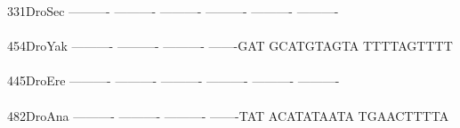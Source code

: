 \documentclass[11pt,twoside,reqno,a4paper]{article}
\begin{document}
{331\hspace*{2\charwidth}DroSec	----------	----------	----------	----------	----------	----------	\\
\hspace*{5\charwidth}\hspace*{7\charwidth}\hspace*{1\charwidth}\hspace*{1\charwidth}\hspace*{1\charwidth}\hspace*{1\charwidth}\hspace*{1\charwidth}\hspace*{1\charwidth}\\
454\hspace*{2\charwidth}DroYak	----------	----------	----------	-------GAT	GCATGTAGTA	TTTTAGTTTT	\\
\hspace*{5\charwidth}\hspace*{7\charwidth}\hspace*{1\charwidth}\hspace*{1\charwidth}\hspace*{1\charwidth}\hspace*{1\charwidth}\hspace*{1\charwidth}\hspace*{1\charwidth}\\
445\hspace*{2\charwidth}DroEre	----------	----------	----------	----------	----------	----------	\\
\hspace*{5\charwidth}\hspace*{7\charwidth}\hspace*{1\charwidth}\hspace*{1\charwidth}\hspace*{1\charwidth}\hspace*{1\charwidth}\hspace*{1\charwidth}\hspace*{1\charwidth}\\
482\hspace*{2\charwidth}DroAna	----------	----------	----------	-------TAT	ACATATAATA	TGAACTTTTA	\\
\hspace*{5\charwidth}\hspace*{7\charwidth}\hspace*{1\charwidth}\hspace*{1\charwidth}\hspace*{1\charwidth}\hspace*{1\charwidth}\hspace*{1\charwidth}\hspace*{1\charwidth}\\
}
\end{document}
